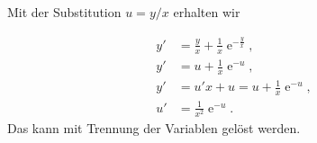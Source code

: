 {\begin{itemize}
\begin{iii}
Mit der Substitution $u=y/x$ erhalten wir

\begin{align*}
y'&=\frac{y}{x} + \frac{1}{x}\operatorname{e}^{-\frac{y}{x}},\\
y'&= u+\frac{1}{x}\operatorname{e}^{-u},\\
y'&= u'x+u = u+\frac{1}{x}\operatorname{e}^{-u},\\
u'&= \frac{1}{x^2}\operatorname{e}^{-u}.
\end{align*}
Das kann mit Trennung der Variablen gelöst werden.

\end{iii}

\end{itemize}
}



